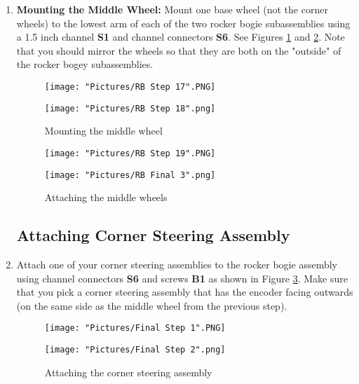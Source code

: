 \documentclass[12pt]{article}
\begin{document}
\begin{enumerate}

\item \textbf{Mounting the Middle Wheel:} Mount one base wheel (not the corner wheels) to the lowest arm of each of the two rocker bogie subassemblies using a 1.5 inch channel \textbf{S1} and channel connectors \textbf{S6}. See Figures \ref{mounting the middle wheel} and \ref{final rocker bogie}.  Note that you should mirror the wheels so that they are both on the "outside" of the rocker bogey subassemblies.

\begin{figure}[H]
  \centering
  \begin{minipage}[b]{0.45\textwidth}
    \texttt{[image: "Pictures/RB Step 17".PNG]}
  \end{minipage}
  \hfill
  \begin{minipage}[b]{0.45\textwidth}
    \texttt{[image: "Pictures/RB Step 18".png]}
  \end{minipage}
  \caption{Mounting the middle wheel}
  \label{mounting the middle wheel}
\end{figure}

\begin{figure}[H]
  \centering
  \begin{minipage}[b]{0.45\textwidth}
    \texttt{[image: "Pictures/RB Step 19".PNG]}
  \end{minipage}
  \hfill
  \begin{minipage}[b]{0.45\textwidth}
    \texttt{[image: "Pictures/RB Final 3".png]}
  \end{minipage}
  \caption{Attaching the middle wheels}
  \label{final rocker bogie}
\end{figure}


\subsection{Attaching Corner Steering Assembly}

\item Attach one of your corner steering assemblies to the rocker bogie assembly using channel connectors \textbf{S6} and screws \textbf{B1} as shown in Figure \ref{attaching corner wheel}. Make sure that you pick a corner steering assembly that has the encoder facing outwards (on the same side as the middle wheel from the previous step).

\begin{figure}[H]
  \centering
  \begin{minipage}[b]{0.45\textwidth}
    \texttt{[image: "Pictures/Final Step 1".PNG]}
  \end{minipage}
  \hfill
  \begin{minipage}[b]{0.45\textwidth}
    \texttt{[image: "Pictures/Final Step 2".png]}
  \end{minipage}
  \caption{Attaching the corner steering assembly}
  \label{attaching corner wheel}
\end{figure}



\end{enumerate}
\end{document}
